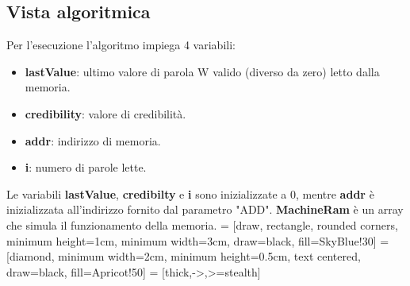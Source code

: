 \documentclass[a4paper]{article}
\begin{document}
\subsection{Vista algoritmica}
Per l'esecuzione l'algoritmo impiega 4 variabili:
\begin{itemize}
\item {\bf lastValue}: ultimo valore di parola W valido (diverso da zero) letto dalla memoria.
\item {\bf credibility}: valore di credibilità.
\item {\bf addr}: indirizzo di memoria.
\item {\bf i}: numero di parole lette.
\end{itemize}
Le variabili {\bf lastValue}, {\bf credibilty} e {\bf i} sono inizializzate a 0, mentre {\bf addr} è inizializzata all'indirizzo fornito dal parametro "ADD". {\bf MachineRam} è un array che simula il funzionamento della memoria.
 = [draw, rectangle, rounded corners, minimum height=1cm, minimum width=3cm, draw=black, fill=SkyBlue!30]
 = [diamond, minimum width=2cm, minimum height=0.5cm, text centered, draw=black, fill=Apricot!50]
 = [thick,->,>=stealth]
\end{document}
